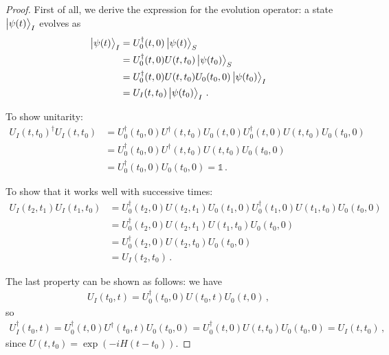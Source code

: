 \documentclass[main.tex]{subfiles}
\begin{document}
\begin{proof}
First of all, we derive the expression for the evolution operator: a state \(\ket{\psi (t)}_{I}\) evolves as
%
\begin{subequations}
\begin{align}
\ket{\psi (t)}_{I} &= U_0 ^\dag (t, 0) \ket{\psi (t)}_{S}  \\
&= U_0 ^\dag (t, 0) U (t, t_0 ) \ket{\psi (t_0 )}_{S}  \\
&= U_0 ^\dag (t, 0) U(t, t_0 ) U_0 (t_0, 0) \ket{\psi (t_0 )}_{I}  \\
&= U_{I} (t, t_0 ) \ket{\psi (t_0 )}_{I}
\,.
\end{align}
\end{subequations}

To show unitarity: 
%
\begin{subequations}
\begin{align}
U_I (t, t_0 ) ^\dag U_I (t, t_0 )
&= 
U_0 ^\dag(t_0 , 0)  
U ^\dag (t, t_0 )  
U_0 (t, 0) 
U_0 ^\dag (t, 0)  
U (t, t_0 ) 
U_0 (t_0 , 0)  \\
&= 
U_0 ^\dag(t_0 , 0)  
U ^\dag (t, t_0 )  
U (t, t_0 ) 
U_0 (t_0 , 0)  \\
&= 
U_0 ^\dag(t_0 , 0)  
U_0 (t_0 , 0)  
= \mathbb{1}
\,.
\end{align}
\end{subequations}

To show that it works well with successive times: 
%
\begin{subequations}
\begin{align}
U_I (t_2, t_1 ) U_I (t_1 , t_0 )
&= U_0 ^\dag (t_2 , 0) U (t_2, t_1 ) U_0 (t_1, 0)
U_0 ^\dag (t_1, 0) U(t_1, t_0 ) U_0 (t_0, 0)  \\
&= U_0 ^\dag (t_2 , 0) U (t_2, t_1 ) U(t_1, t_0 ) U_0 (t_0, 0)  \\
&= U_0 ^\dag (t_2 , 0) U (t_2, t_0 ) U_0 (t_0, 0)  \\
&= U_I (t_2, t_0 )
\,.
\end{align}
\end{subequations}

The last property can be shown as follows: we have
%
\begin{align}
U_I (t_0, t) = U_0 ^\dag (t_0 , 0) U(t_0, t) U_0 (t ,0 )
\,,
\end{align}
%
so 
%
\begin{align}
U_I ^\dag (t_0, t) 
= U_0 ^\dag (t, 0) U ^\dag (t_0 , t) U_0 (t_0, 0) 
= U_0 ^\dag (t, 0) U (t , t_0 ) U_0 (t_0, 0) 
= U_I (t, t_0 )
\,,
\end{align}
%
since \(U(t, t_0 ) = \exp(-i H (t - t_0) )\). 
\end{proof}
\end{document}
